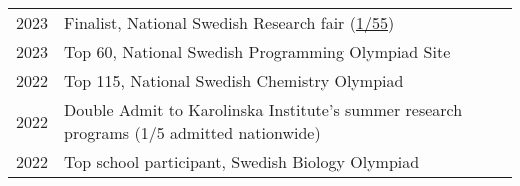 
\begin{longtable}[l]{@{}p{} p{}}

    2023 & Finalist, National Swedish Research fair (\href{https://partner.projectboard.world/viewAll/?tag=UtstallningenUngaForskare2023}{1/55}) \\

    2023 & Top 60, National Swedish Programming Olympiad Site \\

    2022 & Top 115, National Swedish Chemistry Olympiad \\ %

    2022 & Double Admit to Karolinska Institute's summer research programs (1/5 admitted nationwide)\\

    2022 & Top school participant, Swedish Biology Olympiad \\ %
   
\end{longtable}

